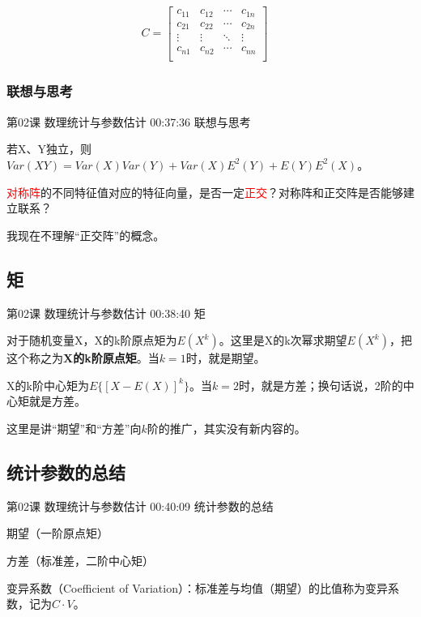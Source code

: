 \documentclass[UTF8]{ctexart}
\begin{document}
\begin{equation}
\begin{aligned}
C=
\begin{bmatrix}
c_{11} & c_{12} & \cdots & c_{1n} \\
c_{21} & c_{22} & \cdots & c_{2n} \\
\vdots & \vdots & \ddots & \vdots \\
c_{n1} & c_{n2} & \cdots & c_{nn} \\
\end{bmatrix}\quad
\end{aligned}
\end{equation}

\subsubsection{联想与思考}

第02课 数理统计与参数估计 00:37:36 联想与思考

若X、Y独立，则$Var(XY)=Var(X)Var(Y)+Var(X)E^{2}(Y)+E(Y)E^{2}(X)$。

\textcolor{red}{对称阵}的不同特征值对应的特征向量，是否一定\textcolor{red}{正交}？对称阵和正交阵是否能够建立联系？

我现在不理解“正交阵”的概念。

\subsection{矩}

第02课 数理统计与参数估计 00:38:40 矩

对于随机变量X，X的k阶原点矩为$E(X^{k})$。这里是X的k次幂求期望$E(X^{k})$，把这个称之为\textbf{X的k阶原点矩}。当$k=1$时，就是期望。

X的k阶中心矩为$E\{  [X-E(X)]^{k} \}$。当$k=2$时，就是方差；换句话说，2阶的中心矩就是方差。

这里是讲“期望”和“方差”向$k$阶的推广，其实没有新内容的。

\subsection{统计参数的总结}

第02课 数理统计与参数估计 00:40:09 统计参数的总结

期望（一阶原点矩）

方差（标准差，二阶中心矩）

变异系数（Coefficient of Variation）：标准差与均值（期望）的比值称为变异系数，记为$C \cdot V$。
\end{document}
